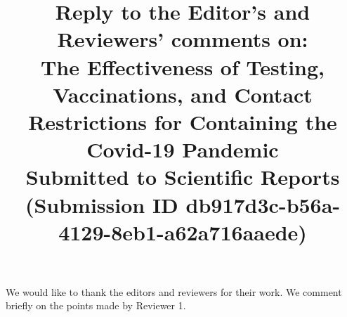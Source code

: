 \documentclass[a4paper,11pt]{article}
\theoremstyle{plain}
\begin{document}
\title{\large Reply to the Editor's and Reviewers' comments on: \\[2ex]
    \LARGE The Effectiveness of Testing, Vaccinations, and Contact Restrictions for
    Containing the Covid-19 Pandemic\\[2ex]
    \large Submitted to Scientific Reports \\(Submission ID
    db917d3c-b56a-4129-8eb1-a62a716aaede)\\[-6ex]
}

\author{}
\date{}

\maketitle

We would like to thank the editors and reviewers for their work. We comment briefly on the points made by Reviewer 1.
\end{document}
